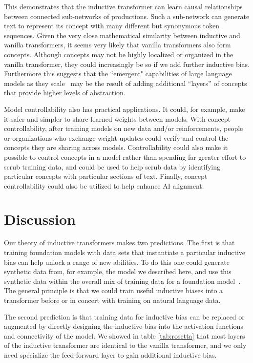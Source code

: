 \documentclass{article}
\begin{document}
This demonstrates that the inductive transformer can learn causal relationships between connected sub-networks of productions. Such a sub-network can generate text to represent its concept with many different but synonymous token sequences. Given the very close mathematical similarity between inductive and vanilla transformers, it seems very likely that vanilla transformers also form concepts.  Although concepts may not be highly localized or organized in the vanilla transformer, they could increasingly be so if we add further inductive bias. Furthermore this suggests that the ``emergent" capabilities of large language models as they scale~\citep{wei2022emergent} may be the result of adding additional ``layers'' of concepts that provide higher levels of abstraction.

Model controllability also has practical applications.  It could, for example, make it safer and simpler to share learned weights between models. With concept controllability, after training models on new data and/or reinforcements, people or organizations who exchange weight updates could verify and control the concepts they are sharing across models. Controllability could also make it possible to control concepts in a model rather than spending far greater effort to scrub training data, and could be used to help scrub data by identifying particular concepts with particular sections of text. Finally, concept controllability could also be utilized to help enhance AI alignment.



\section{Discussion}

Our theory of inductive transformers makes two predictions.  The first is that training foundation models with data sets that instantiate a particular inductive bias can help unlock a range of new abilities.  To do this one could generate synthetic data from, for example, the model we described here, and use this synthetic data within the overall mix of training data for a foundation model~\citep{akyurek2020learning}. The general principle is that we could train useful inductive biases into a transformer before or in concert with training on natural language data.  

The second prediction is that training data for inductive bias can be replaced or augmented by directly designing the inductive bias into the activation functions and connectivity of the model.  We showed in table \ref{tab:rosetta} that most layers of the inductive transformer are identical to the vanilla transformer, and we only need specialize the feed-forward layer to gain additional inductive bias.
\end{document}
